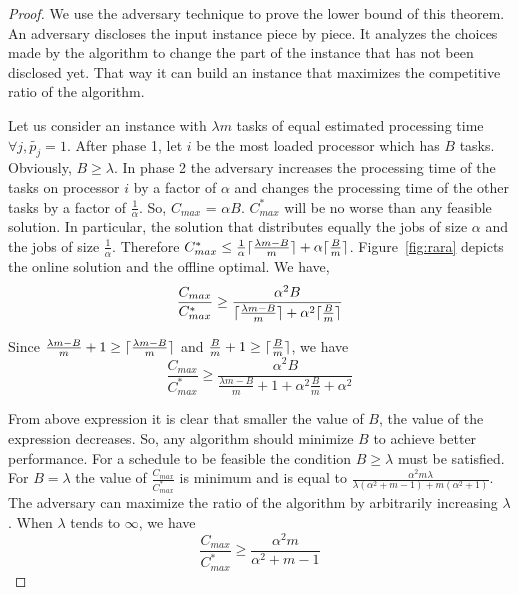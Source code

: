 \documentclass[10pt, conference, compsocconf]{IEEEtran}
\DeclarePairedDelimiter{\ceil}{\lceil}{\rceil}
\begin{document}
\begin{proof}
  We use the adversary technique to prove the lower bound of this
  theorem. An adversary discloses the input instance piece by
  piece. It analyzes the choices made by the algorithm to change the
  part of the instance that has not been disclosed yet. That way it
  can build an instance that maximizes the competitive ratio of the
  algorithm.
 
  Let us consider an instance with $\lambda m$ tasks of equal
  estimated processing time $\forall j, \tilde{p_j} = 1$. After phase
  1, let $i$ be the most loaded processor which has $B$
  tasks. Obviously, $B \geq \lambda$. In phase 2 the adversary
  increases the processing time of the tasks on processor $i$ by a
  factor of $\alpha$ and changes the processing time of the other
  tasks by a factor of $\frac{1}{\alpha}$. So, $ C_{max}$ = $\alpha
  B$. ${C^{*}_{max}}$ will be no worse than any feasible solution. In
  particular, the solution that distributes equally the jobs of size
  $\alpha$ and the jobs of size $\frac{1}{\alpha}$. Therefore
  ${C^{*}_{max}} \leq \frac{1}{\alpha }\ceil {\frac{\lambda m - B
    }{m}}+ \alpha\ceil{\frac{B}{m}} $.  Figure~\ref{fig:rara} depicts
  the online solution and the offline optimal. We have,
 \begin{equation}\nonumber
   \frac{C_{max}}{C^{*}_{max}}
   \geq \frac{\alpha^{2} B  }{\ceil{\frac{
        \lambda m - B }{m}}+\alpha^2\ceil{\frac{B}{m}}}
 \end{equation}
   
 Since $\frac{ \lambda m - B }{m} +1 \geq\ceil{\frac{ \lambda m - B
   }{m}}$ and $\frac{B}{m}+1\geq\ceil{\frac{B}{m}}$, we have
 \begin{equation}\nonumber
   \frac{C_{max}}{C^{*}_{max}}
   \geq \frac{\alpha^{2} B  }{\frac{
       \lambda m - B }{m}+1+\alpha^2\frac{B}{m}+\alpha^{2}}
 \end{equation}
 
 From above expression it is clear that smaller the value of $B$, the
 value of the expression decreases. So, any algorithm should minimize
 $B$ to achieve better performance.  For a schedule to be feasible the
 condition $B \geq \lambda$ must be satisfied. For $B = \lambda$ the
 value of $\frac{C_{max}}{C^{*}_{max}}$ is minimum and is equal to
 $\frac{\alpha^{2} m \lambda }{\lambda(\alpha^{2}+m-1)+
   m(\alpha^{2}+1)}$. The adversary can maximize the ratio of the
 algorithm by arbitrarily increasing $\lambda$. When $\lambda$ tends
 to $\infty$, we have
 \begin{equation}\nonumber
       \frac{C_{max}}{C^{*}_{max}}
       \geq \frac{\alpha^{2}m  }{\alpha^{2}+m-1}
     \end{equation}
 


\end{proof}
\end{document}
